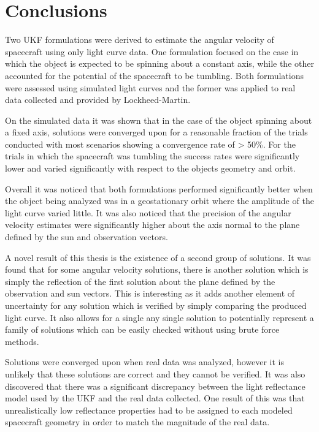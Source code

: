 \chapter{Conclusions}

Two UKF formulations were derived to estimate the angular velocity of spacecraft using only light curve data. One formulation focused on the case in which the object is expected to be spinning about a constant axis, while the other accounted for the potential of the spacecraft to be tumbling. Both formulations were assessed using simulated light curves and the former was applied to real data collected and provided by Lockheed-Martin. 

On the simulated data it was shown that in the case of the object spinning about a fixed axis, solutions were converged upon for a reasonable fraction of the trials conducted with most scenarios showing a convergence rate of > 50\%. For the trials in which the spacecraft was tumbling the success rates were significantly lower and varied significantly with respect to the objects geometry and orbit. 

Overall it was noticed that both formulations performed significantly better when the object being analyzed was in a geostationary orbit where the amplitude of the light curve varied little. It was also noticed that the precision of the angular velocity estimates were significantly higher about the axis normal to the plane defined by the sun and observation vectors.

A novel result of this thesis is the existence of a second group of solutions. It was found that for some angular velocity solutions, there is another solution which is simply the reflection of the first solution about the plane defined by the observation and sun vectors. This is interesting as it adds another element of uncertainty for any solution which is verified by simply comparing the produced light curve. It also allows for a single any single solution to potentially represent a family of solutions which can be easily checked without using brute force methods.

Solutions were converged upon when real data was analyzed, however it is unlikely that these solutions are correct and they cannot be verified. It was also discovered that there was a significant discrepancy between the light reflectance model used by the UKF and the real data collected. One result of this was that unrealistically low reflectance properties had to be assigned to each modeled spacecraft geometry in order to match the magnitude of the real data.

